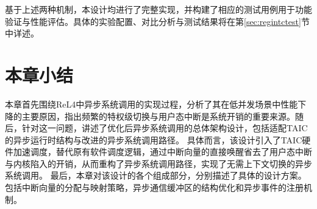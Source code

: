 基于上述两种机制，本设计均进行了完整实现，并构建了相应的测试用例用于功能验证与性能评估。具体的实验配置、对比分析与测试结果将在第\ref{sec:regintctest}节中详述。



\section{本章小结}

本章首先围绕ReL4中异步系统调用的实现过程，分析了其在低并发场景中性能下降的主要原因，指出频繁的特权级切换与用户态中断是系统开销的重要来源。随后，针对这一问题，讲述了优化后异步系统调用的总体架构设计，包括适配TAIC的异步运行时结构与改进的异步系统调用路径。
具体而言，该设计引入了TAIC硬件加速调度，替代原有软件调度逻辑，通过中断向量的直接唤醒省去了用户态中断与内核陷入的开销，从而重构了异步系统调用路径，实现了无需上下文切换的异步系统调用。
最后，本章对该设计的各个组成部分，分别描述了具体的设计方案。包括中断向量的分配与映射策略，异步通信缓冲区的结构优化和异步事件的注册机制。
